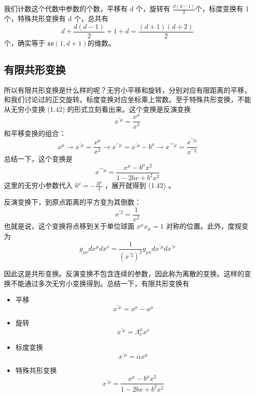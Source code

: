 我们计数这个代数中参数的个数，平移有 d 个，旋转有 $\frac{d(d-1)}{2} $个，标度变换有 1 个，特殊共形变换有 d 个，总共有
\[d+\frac{d(d-1)}{2}+1+d=\frac{(d+1)(d+2)}{2}\]
个，确实等于 $\mathfrak{so}(1,d+1) $的维数。

\subsection{有限共形变换}

所以有限共形变换是什么样的呢？无穷小平移和旋转，分别对应有限距离的平移，和我们讨论过的正交旋转。标度变换对应坐标乘上常数。至于特殊共形变换，不能从无穷小变换 (1.42) 的形式立刻看出来。这个变换是反演变换
\begin{equation}
		x^{\prime \mu}=\frac{x^{\mu}}{x^{2}}
\end{equation}
和平移变换的组合：
\begin{equation}
		x^{\mu} \rightarrow x^{\prime \mu}=\frac{x^{\mu}}{x^{2}} \rightarrow x^{\prime \prime \mu}=x^{\prime \mu}-b^{\mu} \rightarrow x^{\prime \prime \prime \mu}=\frac{x^{\prime \prime \mu}}{x^{\prime \prime 2}}
\end{equation}
总结一下，这个变换是
\begin{equation}
		x^{\prime \prime \prime \mu}=\frac{x^{\mu}-b^{\mu} x^{2}}{1-2 b x+b^{2} x^{2}}
\end{equation}
这里的无穷小参数代入 $b^{\mu}=-\frac{B^{\mu}}{4}$ ，展开就得到 (1.42) 。

反演变换下，到原点距离的平方变为其倒数：
\begin{equation}
		x^{\prime 2}=\frac{1}{x^{2}}
\end{equation}
也就是说，这个变换将点移到关于单位球面 $x^{\mu} x_{\mu}=1$ 对称的位置。此外，度规变为
\begin{equation}
		g_{\mu \nu} d x^{\mu} d x^{\nu}=\frac{1}{\left(x^{\prime 2}\right)^{2}} g_{\mu \nu} d x^{\prime \mu} d x^{\prime \nu}
\end{equation}

因此这是共形变换。反演变换不包含连续的参数，因此称为离散的变换。这样的变换不能通过多次无穷小变换得到。总结一下，有限共形变换有
\begin{itemize}
	\item 平移
	\begin{equation}
		x^{\prime \mu}=x^{\mu}-a^{\mu}
	\end{equation}	
	\item 旋转
	\begin{equation}
		x^{\prime \mu}=\Lambda_{\nu}^{\mu} x^{\nu}
	\end{equation}
	\item 标度变换
	\begin{equation}
		x^{\prime \mu}=\alpha x^{\mu}
	\end{equation}
	\item 特殊共形变换
	\begin{equation}
		x^{\prime \mu}=\frac{x^{\mu}-b^{\mu} x^{2}}{1-2 b x+b^{2} x^{2}}
	\end{equation}
\end{itemize}

